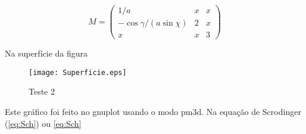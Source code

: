 \begin{equation}
M =
\begin{pmatrix}
1/a & x & x \\
-\cos\gamma/(a\sin\chi) & 2 & x \\
x & x & 3
\end{pmatrix}
\end{equation}

Na superfície da figura

\begin{figure}[!h]
\begin{center}
\texttt{[image: Superficie.eps]}
\end{center}
\caption{Teste 2}
\label{Resistor}
\end{figure}

Este gráfico foi feito no gnuplot usando
o modo pm3d. Na equação de Scrodinger (\ref{eq:Sch})
ou \eqref{eq:Sch}

\begin{comment}
Alguns dos comandos fornecidos pelo Scilab para gerenciar as funções
são apresentadas na tabela~\ref{tab:GenFunc} abaixo.
\begin{table}[!htb]
\begin{center}
\begin{tabular}{ A| m{10.0cm}}
\hline
\rowcolor[gray]{.8}
\textbf{Função}    &
\textbf{Significado} \\
\hline
\texttt{function}    & abre a definição de uma função \\
\texttt{endfunction} & fecha a definição de uma função \\
\hline
\texttt{argn}      & número de argumentos de entrada/saída de uma função\\
\texttt{varargin}  & variável com o número de argumentos da lista de entrada\\
\texttt{varargout} & variável com o número de argumentos da lista de saída\\
\hline
\texttt{fun2string}          & gera a definição ASCII de uma função do Scilab\\
\texttt{get\_function\_path} & obtém o caminho do arquivo fonte de uma biblioteca de funções\\
\texttt{getd}                & obtém todas as funções definidas em um diretório\\
\texttt{head\_comments}      & mostra o cabeçalho de comentários das funções do Scilab\\
\texttt{listfunctions}       & lista as propriedades de todas as funções no ambiente do Scilab\\
\texttt{macrovar}            & variáveis de uma função\\
\hline
\end{tabular}
\end{center}
\caption{Funções do Scilab para gerenciar funções.}
\label{tab:GenFunc}
\end{table}
\end{comment}

